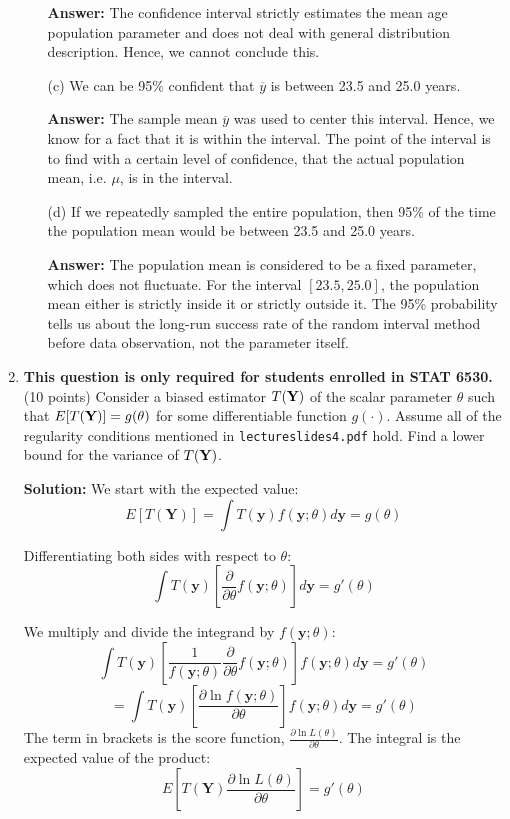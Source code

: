 \documentclass[12pt,letterpaper]{article}
\begin{document}
\begin{enumerate}[leftmargin=*]
\begin{itemize}
 \textbf{Answer:} The confidence interval strictly estimates the mean age population parameter and does not deal with general distribution description. Hence, we cannot conclude this.
 
	\item[(c)] We can be 95$\%$ confident that $\overline{y}$ is between 23.5 and 25.0 years.
 
 \textbf{Answer:} The sample mean $\overline{y}$ was used to center this interval. Hence, we know for a fact that it is within the interval. The point of the interval is to find with a certain level of confidence, that the actual population mean, i.e. $\mu$, is in the interval.
 
	\item[(d)] If we repeatedly sampled the entire population, then 95$\%$ of the time the population mean would be between 23.5 and 25.0 years.
 
 \textbf{Answer:} The population mean is considered to be a fixed parameter, which does not fluctuate. For the interval $[23.5, 25.0]$, the population mean either is strictly inside it or strictly outside it. The 95\% probability tells us about the long-run success rate of the random interval method before data observation, not the parameter itself.
\end{itemize} 

\item \textbf{This question is only required for students enrolled in STAT 6530.} (10 points) Consider a biased estimator $T(\textbf Y)$ of the scalar parameter $\theta$ such that $E[T(\textbf Y)] = g(\theta)$ for some differentiable function $g(\cdot)$. Assume all of the regularity conditions mentioned in \texttt{lectureslides4.pdf} hold. Find a lower bound for the variance of $T(\textbf Y)$.

\textbf{Solution:}
We start with the expected value:
\[ E[T(\textbf{Y})] = \int T(\textbf{y}) f(\textbf{y}; \theta) d\textbf{y} = g(\theta) \]

Differentiating both sides with respect to $\theta$:
\[ \int T(\textbf{y}) \left[ \frac{\partial}{\partial \theta} f(\textbf{y}; \theta) \right] d\textbf{y} = g'(\theta) \]

We multiply and divide the integrand by $f(\textbf{y}; \theta)$:
\[ \int T(\textbf{y}) \left[ \frac{1}{f(\textbf{y}; \theta)} \frac{\partial}{\partial \theta} f(\textbf{y}; \theta) \right] f(\textbf{y}; \theta) d\textbf{y} = g'(\theta) \]
\[= \int T(\textbf{y}) \left[ \frac{\partial \ln f(\textbf{y}; \theta)}{\partial \theta} \right] f(\textbf{y}; \theta) d\textbf{y} = g'(\theta) \]
The term in brackets is the score function, $\frac{\partial \ln L(\theta)}{\partial \theta}$. The integral is the expected value of the product:
\[ E\left[ T(\textbf{Y}) \frac{\partial \ln L(\theta)}{\partial \theta} \right] = g'(\theta) \]


\end{enumerate}
\end{document}
